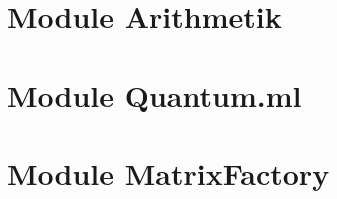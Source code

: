 \documentclass[a4paper,11pt]{tipe}
\begin{document}
\section{Module Arithmetik}
\section{Module Quantum.ml}
\section{Module MatrixFactory}



\nocite*{} %


\end{document}
